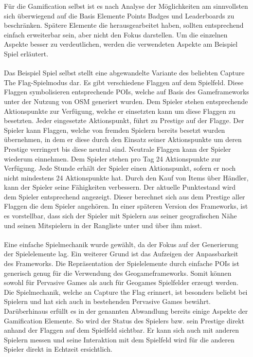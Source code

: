 Für die Gamification selbst ist es nach Analyse der Möglichkeiten am sinnvollsten sich überwiegend auf die Basis Elemente Points Badges und Leaderboards zu beschränken. Spätere Elemente die \textcite{Zichermann.2011} herausgearbeitet haben, sollten entsprechend einfach erweiterbar sein, aber nicht den Fokus darstellen. Um die einzelnen Aspekte besser zu verdeutlichen, werden die verwendeten Aspekte am Beispiel Spiel erläutert.
\\\\
Das Beispiel Spiel selbst stellt eine abgewandelte Variante des beliebten Capture The Flag-Spielmodus dar.\cite{Atkin.1999}
Es gibt verschiedene Flaggen auf dem Spielfeld. Diese Flaggen symbolisieren entsprechende POIs, welche auf Basis des Gameframeworks unter der Nutzung von OSM generiert wurden. Dem Spieler stehen entsprechende Aktionspunkte zur Verfügung, welche er einsetzten kann um diese Flaggen zu besetzten. Jeder eingesetzte Aktionspunkt, führt zu \glqq Prestige\grqq{} auf der Flagge. Der Spieler kann Flaggen, welche von fremden Spielern bereits besetzt wurden übernehmen, in dem er diese durch den Einsatz seiner Aktionspunkte um deren Prestige verringert bis diese neutral sind. Neutrale Flaggen kann der Spieler wiederum einnehmen. Dem Spieler stehen pro Tag 24 Aktionspunkte zur Verfügung. Jede Stunde erhält der Spieler einen Aktionspunkt, sofern er noch nicht mindestens 24 Aktionspunkte hat. Durch den Kauf von Items über Händler, kann der Spieler seine Fähigkeiten verbessern. Der aktuelle Punktestand wird dem Spieler entsprechend angezeigt.
Dieser berechnet sich aus dem Prestige aller Flaggen die dem Spieler angehören. 
In einer späteren Version des Frameworks, ist es vorstellbar, dass sich der Spieler mit Spielern aus seiner geografischen Nähe und seinen Mitspielern in der Rangliste unter und über ihm misst.
\\\\
Eine einfache Spielmechanik wurde gewählt, da der Fokus auf der Generierung der Spielelemente lag. Ein weiterer Grund ist das Aufzeigen der Anpassbarkeit des Frameworks. Die Repräsentation der Spielelemente durch einfache POIs ist generisch genug für die Verwendung des Geogameframeworks. Somit können sowohl für Pervasive Games als auch für Geogames Spielfelder erzeugt werden. Die Spielmechanik, welche an Capture the Flag erinnert, ist besonders beliebt bei Spielern und hat sich auch in bestehenden Pervasive Games bewährt.\cite{Bell.2006,Ingress.2014} Darüberhinaus erfüllt es in der genannten Abwandlung bereits einige Aspekte der Gamification Elemente. So wird der Status des Spielers bzw. sein \glqq Prestige\grqq{} direkt anhand der Flaggen auf dem Spielfeld sichtbar. Er kann sich auch mit anderen Spielern messen und seine Interaktion mit dem Spielfeld wird für die anderen Spieler direkt in Echtzeit ersichtlich.
